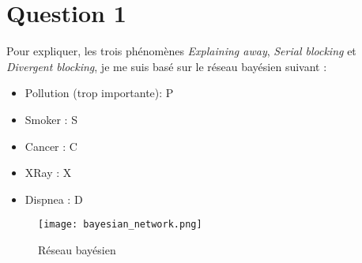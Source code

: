 \documentclass[12pt]{article}
\begin{document}
\section{Question 1}
Pour expliquer, les trois phénomènes \textit{Explaining away}, \textit{Serial blocking} et \textit{Divergent blocking}, je me suis basé sur le réseau bayésien suivant : 
\begin{itemize}
\item Pollution (trop importante): P
\item Smoker : S
\item Cancer : C
\item XRay : X
\item Dispnea : D
\end{itemize}
\begin{figure}[H]
\begin{center}
	\texttt{[image: bayesian\_network.png]}
	\caption{Réseau bayésien}
	\label{fig:reseau_bayesien}
\end{center}
\end{figure}
\end{document}
